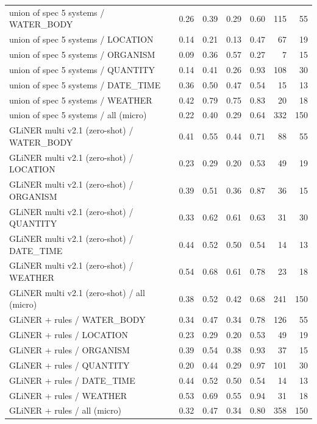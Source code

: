 \begin{table}[htbp]
\begin{tabular}{lrrrrrr}
union of spec 5 systems / WATER\_BODY & 0.26 & 0.39 & 0.29 & 0.60 & 115 & 55 \\
union of spec 5 systems / LOCATION & 0.14 & 0.21 & 0.13 & 0.47 & 67 & 19 \\
union of spec 5 systems / ORGANISM & 0.09 & 0.36 & 0.57 & 0.27 & 7 & 15 \\
union of spec 5 systems / QUANTITY & 0.14 & 0.41 & 0.26 & 0.93 & 108 & 30 \\
union of spec 5 systems / DATE\_TIME & 0.36 & 0.50 & 0.47 & 0.54 & 15 & 13 \\
union of spec 5 systems / WEATHER & 0.42 & 0.79 & 0.75 & 0.83 & 20 & 18 \\
union of spec 5 systems / all (micro) & 0.22 & 0.40 & 0.29 & 0.64 & 332 & 150 \\
GLiNER multi v2.1 (zero-shot) / WATER\_BODY & 0.41 & 0.55 & 0.44 & 0.71 & 88 & 55 \\
GLiNER multi v2.1 (zero-shot) / LOCATION & 0.23 & 0.29 & 0.20 & 0.53 & 49 & 19 \\
GLiNER multi v2.1 (zero-shot) / ORGANISM & 0.39 & 0.51 & 0.36 & 0.87 & 36 & 15 \\
GLiNER multi v2.1 (zero-shot) / QUANTITY & 0.33 & 0.62 & 0.61 & 0.63 & 31 & 30 \\
GLiNER multi v2.1 (zero-shot) / DATE\_TIME & 0.44 & 0.52 & 0.50 & 0.54 & 14 & 13 \\
GLiNER multi v2.1 (zero-shot) / WEATHER & 0.54 & 0.68 & 0.61 & 0.78 & 23 & 18 \\
GLiNER multi v2.1 (zero-shot) / all (micro) & 0.38 & 0.52 & 0.42 & 0.68 & 241 & 150 \\
GLiNER + rules / WATER\_BODY & 0.34 & 0.47 & 0.34 & 0.78 & 126 & 55 \\
GLiNER + rules / LOCATION & 0.23 & 0.29 & 0.20 & 0.53 & 49 & 19 \\
GLiNER + rules / ORGANISM & 0.39 & 0.54 & 0.38 & 0.93 & 37 & 15 \\
GLiNER + rules / QUANTITY & 0.20 & 0.44 & 0.29 & 0.97 & 101 & 30 \\
GLiNER + rules / DATE\_TIME & 0.44 & 0.52 & 0.50 & 0.54 & 14 & 13 \\
GLiNER + rules / WEATHER & 0.53 & 0.69 & 0.55 & 0.94 & 31 & 18 \\
GLiNER + rules / all (micro) & 0.32 & 0.47 & 0.34 & 0.80 & 358 & 150 \\
\bottomrule
\end{tabular}
\end{table}
